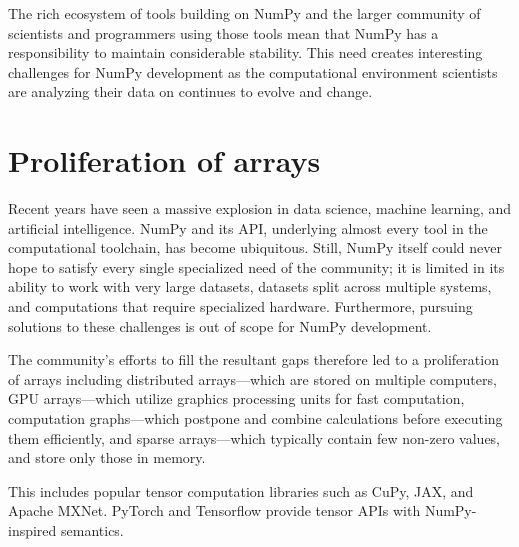 The rich ecosystem of tools building on NumPy and the larger community
of scientists and programmers using those tools mean that NumPy has a
responsibility to maintain considerable stability.
This need creates interesting challenges for NumPy development as the
computational environment scientists are analyzing their data on continues
to evolve and change.

\section*{Proliferation of arrays}



Recent years have seen a massive explosion in data science, machine learning,
and artificial intelligence.  NumPy and its API, underlying almost every tool
in the computational toolchain, has become ubiquitous.  Still, NumPy itself
could never hope to satisfy every single specialized need of the community; it
is limited in its ability to work with very large datasets, datasets split
across multiple systems, and computations that require specialized hardware.
Furthermore, pursuing solutions to these challenges is out of scope for NumPy
development.

The community's efforts to fill the resultant gaps therefore led to a
proliferation of arrays including distributed arrays---which are stored on
multiple computers, GPU arrays---which utilize graphics processing units for
fast computation, computation graphs---which postpone and combine calculations
before executing them efficiently, and sparse arrays---which typically contain
few non-zero values, and store only those in memory.

This includes popular tensor computation libraries such as
CuPy, JAX, and Apache MXNet.
PyTorch and Tensorflow provide tensor APIs with NumPy-inspired semantics.

